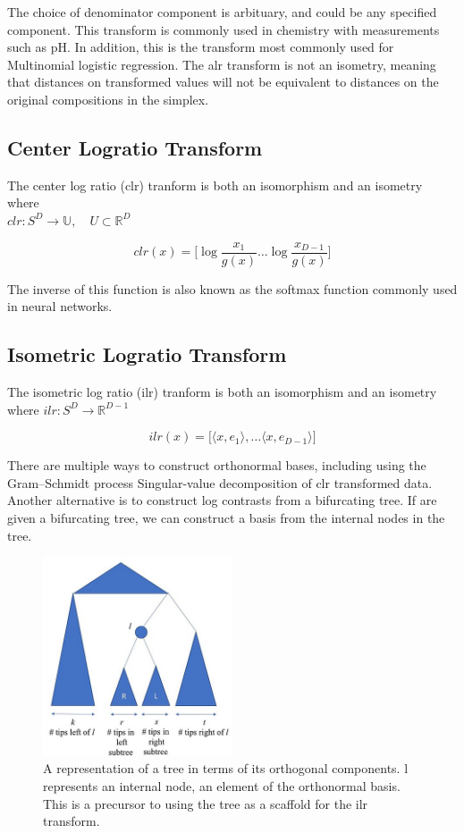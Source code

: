 The choice of denominator component is arbituary, and could be any specified component.
This transform is commonly used in chemistry with measurements such as pH.  In addition, this is the transform most commonly used for Multinomial logistic regression.  The alr transform is not an isometry, meaning that distances on transformed values will not be equivalent to distances on the original compositions in the simplex.

\subsection{Center Logratio Transform}
The center log ratio (clr) tranform is both an isomorphism and an isometry where \\$clr: S^D \rightarrow \mathbb{U}, \quad U \subset \mathbb{R}^{D} $

\[clr(x) = \big[ \log \frac{x_1}{g(x)} \ldots \log \frac{x_{D-1}}{g(x)} \big] \]

The inverse of this function is also known as the softmax function commonly used in neural networks.

\subsection{Isometric Logratio Transform}
The isometric log ratio (ilr) tranform is both an isomorphism and an isometry where $ilr: S^D \rightarrow \mathbb{R}^{D-1} $

\[
ilr(x) = \big[ \langle x, e_1 \rangle, \ldots \langle x, e_{D-1} \rangle]
\]

There are multiple ways to construct orthonormal bases, including using the Gram–Schmidt process Singular-value decomposition of clr transformed data.
Another alternative is to construct log contrasts from a bifurcating tree.  If are given a bifurcating tree, we can construct a basis from the internal nodes in the tree.

 \begin{figure}[H]
         \centering
         \includegraphics[width=0.5\textwidth]{appendix_c/Orthogonal-tree-basis.jpg}
         \caption[An illustration of the bifurcating trees as an orthonormal basis.]
                 {A representation of a tree in terms of its orthogonal components. l represents an internal node, an element of the orthonormal basis. This is a precursor to using the tree as a scaffold for the ilr transform.}
         \label{figcS1}
 \end{figure}

